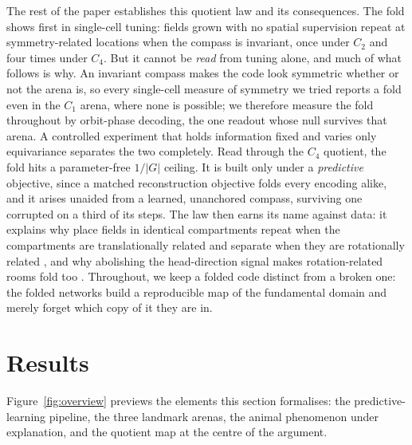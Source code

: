 The rest of the paper establishes this quotient law and its consequences. The fold shows first in
single-cell tuning: fields grown with no spatial supervision repeat at symmetry-related locations
when the compass is invariant, once under $C_2$ and four times under $C_4$. But it cannot be
\emph{read} from tuning alone, and much of what follows is why. An invariant compass makes the code
look symmetric whether or not the arena is, so every single-cell measure of symmetry we tried reports
a fold even in the $C_1$ arena, where none is possible; we therefore measure the fold throughout by
orbit-phase decoding, the one readout whose null survives that arena. A controlled experiment that
holds information fixed and varies only equivariance separates the two completely. Read through the
$C_4$ quotient, the fold hits a parameter-free $1/|G|$ ceiling. It is built only under a
\emph{predictive} objective, since a matched reconstruction objective folds every encoding alike, and
it arises unaided from a learned, unanchored compass, surviving one corrupted on a third of its
steps. The law then earns its name against data: it explains why place fields in identical
compartments repeat when the compartments are translationally related and separate when they are
rotationally related \citep{grieves2016, spiers2015}, and why abolishing the head-direction signal
makes rotation-related rooms fold too \citep{harland2017}. Throughout, we keep a folded code distinct
from a broken one: the folded networks build a reproducible map of the fundamental domain and merely
forget which copy of it they are in.

\section*{Results}

Figure~\ref{fig:overview} previews the elements this section formalises: the predictive-learning
pipeline, the three landmark arenas, the animal phenomenon under explanation, and the quotient map at
the centre of the argument.

